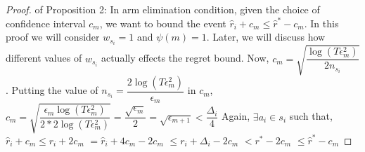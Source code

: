 \begin{proof} of Proposition 2:
\newline In arm elimination condition, given the choice of confidence interval $c_{m}$, we want to bound the event $\hat{r}_{i}+c_{m}\leq \hat{r}^{*}-c_{m}$. In this proof we will consider $w_{s_{i}}=1$ and $\psi(m)=1$. Later, we will discuss how different values of $w_{s_{i}}$ actually effects the regret bound.
\newline Now, $c_{m}=\sqrt{\dfrac{\log (T\epsilon_{m}^{2})}{2 n_{s_{i}}}}$.
\newline Putting the value of $n_{s_{i}}=\dfrac{2\log{(T\epsilon_{m}^{2})}}{\epsilon_{m}}$ in $c_{m}$,
\newline $c_{m}=\sqrt{\dfrac{\epsilon_{m}\log (T\epsilon_{m}^{2})}{2*2 \log(T\epsilon_{m}^{2})}}=\dfrac{\sqrt{\epsilon_{m}}}{2} = \sqrt{\epsilon_{m+1}} < \dfrac{\Delta_{i}}{4} $
\newline Again, $\exists a_{i} \in s_{i}$ such that, 
$\hat{r}_{i} + c_{m}\leq r_{i} + 2c_{m} $
\newline\hspace*{14em}$= \hat{r}_{i} + 4c_{m} - 2c_{m} $
\newline\hspace*{14em}$\leq r_{i} + \Delta_{i} - 2c_{m}$
\newline\hspace*{14em}$< r^{*} -2c_{m} $
\newline\hspace*{14em}$\leq \hat{r}^{*} - c_{m}$

\end{proof}
